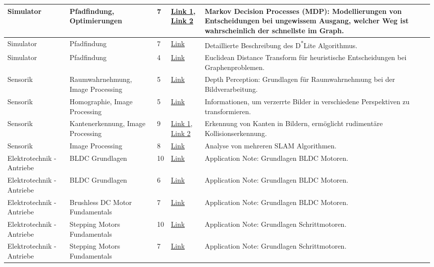\documentclass[main.tex]{subfiles} %
\begin{document}
\begin{longtable}{@{} L{2.5cm} L{2.9cm} C{1cm} L{1.2cm} L{6cm} @{}}
Simulator & Pfadfindung, Optimierungen & 7 & \href{https://ai.dmi.unibas.ch/\_files/teaching/hs21/po/slides/po-f01.pdf}{Link 1}, \href{https://www.math.leidenuniv.nl/\~{}kallenberglcm/Lecture-notes-MDP.pdf}{Link 2} & Markov Decision Processes (MDP): Modellierungen von Entscheidungen bei ungewissem Ausgang, welcher Weg ist wahrscheinlich der schnellste im Graph. \\
\hline
Simulator & Pfadfindung & 7 & \href{https://idm-lab.org/bib/abstracts/papers/aaai02b.pdf}{Link} & Detaillierte Beschreibung des D\textsuperscript{*}Lite Algorithmus. \\
\hline
Simulator & Pfadfindung & 4 & \href{http://sibgrapi.sid.inpe.br/col/sid.inpe.br/banon/2002/11.13.11.53/doc/269-275.pdf}{Link} & Euclidean Distance Transform für heuristische Entscheidungen bei Graphenproblemen. \\
\hline
Sensorik & Raumwahrnehmung, Image Processing & 5 & \href{http://www.robotics.stanford.edu/\~{}ang/papers/aaai08-Make3dDepthPerceptionSingleImage.pdf}{Link} & Depth Perception: Grundlagen für Raumwahrnehmung bei der Bildverarbeitung. \\
\hline
Sensorik & Homographie, Image Processing & 5 & \href{https://docs.opencv.org/4.x/d9/dab/tutorial\_homography.html}{Link} & Informationen, um verzerrte Bilder in verschiedene Perspektiven zu transformieren. \\
\hline
Sensorik & Kantenerkennung, Image Processing & 9 & \href{https://docs.opencv.org/4.x/da/d22/tutorial\_py\_canny.html}{Link 1}, \href{https://iopscience.iop.org/article/10.1088/1757-899X/1096/1/012079/pdf}{Link 2} & Erkennung von Kanten in Bildern, ermöglicht rudimentäre Kollisionserkennung. \\
\hline
Sensorik & Image Processing & 8 & \href{https://hal.science/hal-04132827/document}{Link} & Analyse von mehreren SLAM Algorithmen. \\
\hline
Elektrotechnik - Antriebe & BLDC Grundlagen & 10 & \href{https://www.microchip.com/en-us/application-notes/an885}{Link} & Application Note: Grundlagen BLDC Motoren. \\
\hline
Elektrotechnik - Antriebe & BLDC Grundlagen & 6 & \href{https://www.silabs.com/documents/public/application-notes/an0816-efm32-brushless-dc-motor-control.pdf}{Link} & Application Note: Grundlagen BLDC Motoren. \\
\hline
Elektrotechnik - Antriebe & Brushless DC Motor Fundamentals & 7 & \href{https://media.monolithicpower.com/document/Brushless\_DC\_Motor\_Fundamentals.pdf}{Link} & Application Note: Grundlagen BLDC Motoren. \\
\hline
Elektrotechnik - Antriebe & Stepping Motors Fundamentals & 10 & \href{https://www.microchip.com/en-us/application-notes/an907}{Link} & Application Note: Grundlagen Schrittmotoren. \\
\hline
Elektrotechnik - Antriebe & Stepping Motors Fundamentals & 7 & \href{https://download.beckhoff.com/download/document/application\_notes/dk9222-0410-0014.pdf}{Link} & Application Note: Grundlagen Schrittmotoren. \\


\end{longtable}
\end{document}
